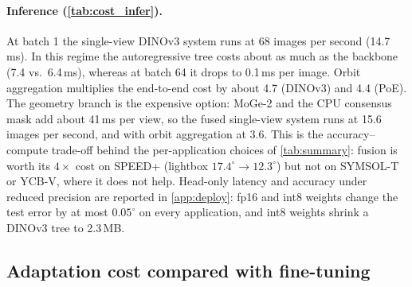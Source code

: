 \paragraph{Inference (\cref{tab:cost_infer}).} At batch 1 the single-view DINOv3 system runs at 68 images per second (14.7\,ms). In this regime the autoregressive tree costs about as much as the backbone (7.4 vs.\ 6.4\,ms), whereas at batch 64 it drops to 0.1\,ms per image. Orbit aggregation multiplies the end-to-end cost by about 4.7 (DINOv3) and 4.4 (PoE). The geometry branch is the expensive option: MoGe-2 and the CPU consensus mask add about 41\,ms per view, so the fused single-view system runs at 15.6 images per second, and with orbit aggregation at 3.6. This is the accuracy--compute trade-off behind the per-application choices of \cref{tab:summary}: fusion is worth its $4\times$ cost on SPEED+ (lightbox $17.4^\circ\to12.3^\circ$) but not on SYMSOL-T or YCB-V, where it does not help. Head-only latency and accuracy under reduced precision are reported in \cref{app:deploy}: fp16 and int8 weights change the test error by at most $0.05^\circ$ on every application, and int8 weights shrink a DINOv3 tree to 2.3\,MB.

\subsection{Adaptation cost compared with fine-tuning}
\label{sec:ft}

\begin{table}[t]
  \centering\footnotesize
  \setlength{\tabcolsep}{3pt}
  \resizebox{\linewidth}{!}{}
  \caption{\textbf{What each method trains to adapt to a new target}, as reported by each source (SPEED+). None of the fine-tuned methods reports its training wall-clock time, so we compare the training work they state. $^\ddagger$\,Backprop passes: training images passed forward \emph{and backward} through the backbone, derived from the reported schedule as epochs $\times$ the 47,966-image SPEED+ training set (models in an ensemble counted separately); our backbones receive no gradients and are run forward once per training image and view (0.14\,M passes per backbone). $^a$\,schedule reported for the ablation models. $^b$\,both rotation trees and the translation block; 2.39\,M with the DINOv3 tree alone. n.r.: not reported. Accuracy settings differ (crop source, test-time passes, ensembles); only rows with the same crop setting are matched.}
  \label{tab:ft_cost}
\end{table}

